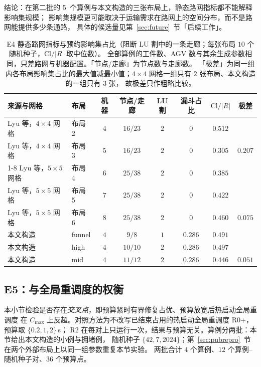 \documentclass[manuscript,screen,review]{acmart}
\newcommand{\NSeeds}{10}
\newcommand{\EfiveInst}{4}          %
\newcommand{\EfiveCells}{12}        %
\newcommand{\EfivePts}{36}          %
\newcommand{\NPubInst}{5}
\newcommand{\PubCloSpread}{0.207}
\newcommand{\PubCloSpreadBig}{0.075}
\newcommand{\SelfCloSpread}{0.051}
\begin{document}
结论：在第二批的 \NPubInst\ 个算例与本文构造的三张布局上，静态路网指标都不能解释影响集规模；
影响集规模更可能取决于运输需求在路网上的空间分布，而不是路网能提供多少条通路，
具体的候选量见第~\ref{sec:future}~节「后续工作」。

\begin{table}[t]
\centering
\caption{E4 静态路网指标与预约影响集占比（阻断 LU 割中的一条走廊；每张布局 \(\NSeeds\) 个随机种子，\(\mathrm{Cl}/|R|\) 取中位数）。
全部算例的工件数、AGV 数与其余生成参数相同，只差路网与机器配置。「节点/走廊」为节点数与走廊数。
「极差」为同一组内各布局影响集占比的最大值减最小值；\(4\times 4\) 网格一组只有 \(2\) 张布局、本文构造的一组只有 \(3\) 张，
故极差只作粗略比较。}
\label{tab:e4pub}
\small
\begin{tabular}{@{}llcccccc@{}}
\toprule
来源与网格 & 布局 & 机器 & 节点/走廊 & LU 割 & 漏斗占比 & \(\mathrm{Cl}/|R|\)
 & 极差 \\
\midrule
Lyu 等，\(4\times 4\) 网格 & 布局 2 & \(4\) & \(16/23\) & \(2\) & \(0\) & \(0.512\) & \\
Lyu 等，\(4\times 4\) 网格 & 布局 3 & \(5\) & \(16/23\) & \(2\) & \(0\) & \(0.305\)
  & \(\PubCloSpread\) \\
\cmidrule{1-8}
Lyu 等，\(5\times 5\) 网格 & 布局 4 & \(6\) & \(25/38\) & \(2\) & \(0\) & \(0.385\) & \\
Lyu 等，\(5\times 5\) 网格 & 布局 5 & \(7\) & \(25/38\) & \(2\) & \(0\) & \(0.422\) & \\
Lyu 等，\(5\times 5\) 网格 & 布局 6 & \(8\) & \(25/38\) & \(2\) & \(0\) & \(0.460\)
  & \(\PubCloSpreadBig\) \\
\midrule
本文构造 & funnel & \(4\) & \(9/8\) & \(1\) & \(0.286\) & \(0.491\) & \\
本文构造 & high & \(4\) & \(10/10\) & \(2\) & \(0.286\) & \(0.497\) & \\
本文构造 & mid & \(4\) & \(11/12\) & \(2\) & \(0.286\) & \(0.446\)
  & \(\SelfCloSpread\) \\
\bottomrule
\end{tabular}
\end{table}

\subsection{E5：与全局重调度的权衡}
\label{sec:e5}

本小节检验是否存在\emph{交叉点}，即预算紧时有界修复占优、预算放宽后热启动全局重调度
在 \(C_{\max}\) 上反超。对照方法为不改写已结束占用的热启动全局重调度 R0+，预算取 \(\{0.2,1,2\}\)\,s；
R2 在每对上只运行一次，结果与预算无关。算例分两批：本节给出本文构造的小例与拥堵例，
随机种子 \(\{42,7,2024\}\)；第~\ref{sec:pubrepro}~节在两个外部布局上以同一组参数重复本节实验。
两批合计 \(\EfiveInst\) 个算例、\(\EfiveCells\) 个算例--随机种子对、\(\EfivePts\) 个预算点。
\end{document}
